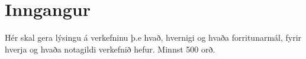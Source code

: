 \section{Inngangur}
Hér skal gera lýsingu á verkefninu þ.e hvað,  hvernigi og  hvaða forritunarmál, fyrir hverja og hvaða notagildi verkefnið hefur. Minnst 500 orð. 
